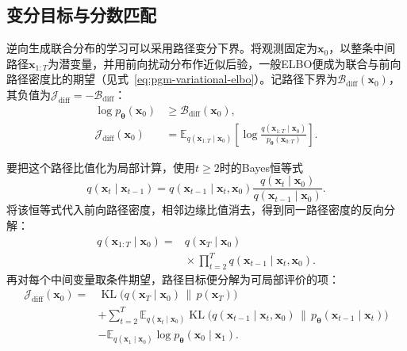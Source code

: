 \subsection{变分目标与分数匹配}
\label{sec:pgm-generative-diffusion-objective}

逆向生成联合分布的学习可以采用路径变分下界。将观测固定为$\bm{x}_0$，以整条中间路径$\bm{x}_{1:T}$为潜变量，并用前向扰动分布作近似后验，一般ELBO便成为联合与前向路径密度比的期望（见式~\eqref{eq:pgm-variational-elbo}）。记路径下界为$\mathcal{B}_{\mathrm{diff}}(\bm{x}_0)$，其负值为$\mathcal{J}_{\mathrm{diff}}=-\mathcal{B}_{\mathrm{diff}}$：
\begin{equation}
  \label{eq:pgm-generative-path-elbo}
  \begin{aligned}
    \log p_{\bm{\theta}}(\bm{x}_0)
      &\geq\mathcal{B}_{\mathrm{diff}}(\bm{x}_0),\\
    \mathcal{J}_{\mathrm{diff}}(\bm{x}_0)
      &=\mathbb{E}_{q(\bm{x}_{1:T}\mid\bm{x}_0)}
         \left[\log
           \frac{q(\bm{x}_{1:T}\mid\bm{x}_0)}
                {p_{\bm{\theta}}(\bm{x}_{0:T})}
         \right].
  \end{aligned}
\end{equation}

要把这个路径比值化为局部计算，使用$t\geq2$时的Bayes恒等式
\[
  q(\bm{x}_t\mid\bm{x}_{t-1})
  =q(\bm{x}_{t-1}\mid\bm{x}_t,\bm{x}_0)
     \frac{q(\bm{x}_t\mid\bm{x}_0)}
          {q(\bm{x}_{t-1}\mid\bm{x}_0)}.
\]
将该恒等式代入前向路径密度，相邻边缘比值消去，得到同一路径密度的反向分解：
\[
  \begin{aligned}
    q(\bm{x}_{1:T}\mid\bm{x}_0)
      ={}&q(\bm{x}_T\mid\bm{x}_0)\\
         &{}\times\prod_{t=2}^{T}
              q(\bm{x}_{t-1}\mid\bm{x}_t,\bm{x}_0).
  \end{aligned}
\]
再对每个中间变量取条件期望，路径目标便分解为可局部评价的项：
\begin{equation}
  \label{eq:pgm-generative-ddpm-kl}
  \begin{aligned}
    \mathcal{J}_{\mathrm{diff}}(\bm{x}_0)
      ={}&\operatorname{KL}\bigl(
          q(\bm{x}_T\mid\bm{x}_0)\,\|\,p(\bm{x}_T)\bigr)\\
       &+\sum_{t=2}^{T}
         \mathbb{E}_{q(\bm{x}_t\mid\bm{x}_0)}
          \operatorname{KL}\bigl(
           q(\bm{x}_{t-1}\mid\bm{x}_t,\bm{x}_0)
           \,\|\,p_{\bm{\theta}}(\bm{x}_{t-1}\mid\bm{x}_t)
                         \bigr)\\
       &-\mathbb{E}_{q(\bm{x}_1\mid\bm{x}_0)}
          \log p_{\bm{\theta}}(\bm{x}_0\mid\bm{x}_1).
  \end{aligned}
\end{equation}

